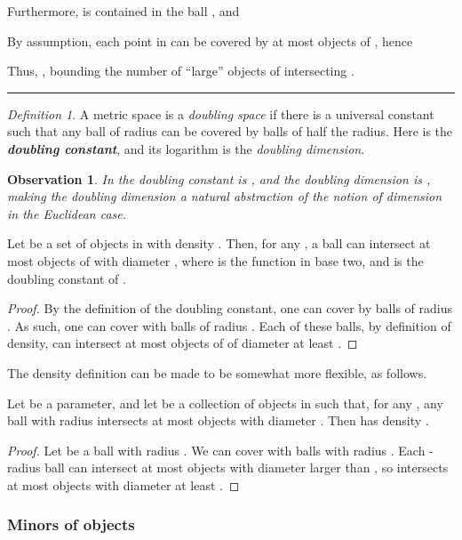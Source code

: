 \documentclass[12pt]{article}
\newcommand{\emphic}[2]{\textcolor{blue25}{\textbf{\emph{#1}}}\index{#2}}
\renewcommand{\emphic}[2]{\textbf{\emph{#1}}}
\newcommand{\emphi}[1]{\emphic{#1}{#1}}
\newtheorem{observation}[theorem]{Observation}
\newcommand{\myqedsymbol}{\rule{2mm}{2mm}}
\theoremstyle{remark}\theoremheaderfont{\sf}\theorembodyfont{\upshape}
\newtheorem{defn}[theorem]{Definition}
\numberwithin{figure}{section}\numberwithin{table}{section}\numberwithin{equation}{section}
\newcommand{\lemlab}[1]{\label{lemma:#1}}
\newcommand{\obslab}[1]{\label{observation:#1}}
\begin{document}
Furthermore,  is contained in the ball
, and

By assumption, each point in  can be covered by at most 
objects of , hence

Thus, , bounding the number of
``large'' objects of  intersecting .\hfill\myqedsymbol


\begin{defn}
  A metric space  is a \emph{doubling space} if there is a
  universal constant  such that any ball  of radius
   can be covered by  balls of half the radius. Here 
  is the \emphi{doubling constant}, and its logarithm is the
  \emph{doubling dimension}.
\end{defn}

\begin{observation}
  \obslab{d:c:d}In  the doubling constant is , and the
  doubling dimension is  \cite{v-cbseb-05}, making the doubling
  dimension a natural abstraction of the notion of dimension in the
  Euclidean case.
\end{observation}

\begin{lemma}
  \lemlab{density:smaller:objects}Let  be a set of objects in  with density
  . Then, for any , a ball
   can intersect at most
   objects of  with
  diameter , where  is the  function in
  base two, and  is the doubling constant of .
\end{lemma}
\begin{proof}
  By the definition of the doubling constant, one can cover  by
   balls of radius .  As such, one can cover
   with  balls of radius
  . Each of these balls, by definition of density, can
  intersect at most  objects of  of diameter at
  least .
\end{proof}

The density definition can be made to be somewhat more flexible, as
follows.

\begin{lemma}
  Let  be a parameter, and let  be a collection of
  objects in  such that, for any , any ball with radius 
  intersects at most  objects with diameter
  . Then  has density
  .
\end{lemma}
\begin{proof}
  Let  be a ball with radius . We can cover  with
   balls with radius . Each
  -radius ball can intersect at most  objects
  with diameter larger than , so 
  intersects at most  objects
  with diameter at least .
\end{proof}


\subsubsection{Minors of objects}
\end{document}
